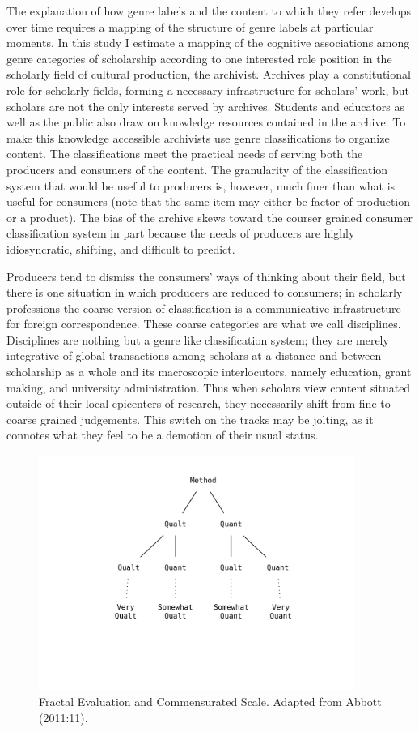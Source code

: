 \documentclass[]{book}
\theoremstyle{definition}
\theoremstyle{definition}
\theoremstyle{definition}
\theoremstyle{remark}
\begin{document}
The explanation of how genre labels and the content to which they refer
develops over time requires a mapping of the structure of genre labels
at particular moments. In this study I estimate a mapping of the
cognitive associations among genre categories of scholarship according
to one interested role position in the scholarly field of cultural
production, the archivist. Archives play a constitutional role for
scholarly fields, forming a necessary infrastructure for scholars' work,
but scholars are not the only interests served by archives. Students and
educators as well as the public also draw on knowledge resources
contained in the archive. To make this knowledge accessible archivists
use genre classifications to organize content. The classifications meet
the practical needs of serving both the producers and consumers of the
content. The granularity of the classification system that would be
useful to producers is, however, much finer than what is useful for
consumers (note that the same item may either be factor of production or
a product). The bias of the archive skews toward the courser grained
consumer classification system in part because the needs of producers
are highly idiosyncratic, shifting, and difficult to predict.

Producers tend to dismiss the consumers' ways of thinking about their
field, but there is one situation in which producers are reduced to
consumers; in scholarly professions the coarse version of classification
is a communicative infrastructure for foreign correspondence. These
coarse categories are what we call disciplines. Disciplines are nothing
but a genre like classification system; they are merely integrative of
global transactions among scholars at a distance and between scholarship
as a whole and its macroscopic interlocutors, namely education, grant
making, and university administration. Thus when scholars view content
situated outside of their local epicenters of research, they necessarily
shift from fine to coarse grained judgements. This switch on the tracks
may be jolting, as it connotes what they feel to be a demotion of their
usual status.

\begin{figure}

{\centering \includegraphics[width=4.07in]{img/fractal} 

}

\caption{Fractal Evaluation and Commensurated Scale. Adapted from Abbott (2011:11).}\label{fig:fractalp}
\end{figure}
\end{document}

